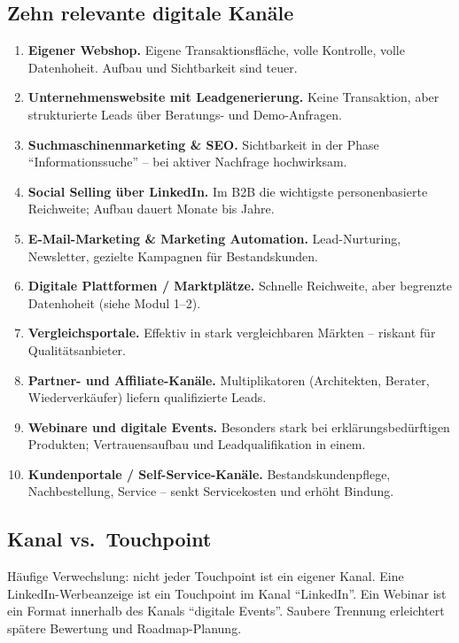 \documentclass[11pt,a4paper,oneside]{article}
\newcommand{\fachbegriff}[1]{\textbf{#1}}
\begin{document}
\subsection{Zehn relevante digitale Kanäle}

\begin{enumerate}
  \item \fachbegriff{Eigener Webshop.} Eigene Transaktionsfläche, volle Kontrolle, volle Datenhoheit. Aufbau und Sichtbarkeit sind teuer.
  \item \fachbegriff{Unternehmenswebsite mit Leadgenerierung.} Keine Transaktion, aber strukturierte Leads über Beratungs- und Demo-Anfragen.
  \item \fachbegriff{Suchmaschinenmarketing \& SEO.} Sichtbarkeit in der Phase ``Informationssuche'' -- bei aktiver Nachfrage hochwirksam.
  \item \fachbegriff{Social Selling über LinkedIn.} Im B2B die wichtigste personenbasierte Reichweite; Aufbau dauert Monate bis Jahre.
  \item \fachbegriff{E-Mail-Marketing \& Marketing Automation.} Lead-Nurturing, Newsletter, gezielte Kampagnen für Bestandskunden.
  \item \fachbegriff{Digitale Plattformen / Marktplätze.} Schnelle Reichweite, aber begrenzte Datenhoheit (siehe Modul 1--2).
  \item \fachbegriff{Vergleichsportale.} Effektiv in stark vergleichbaren Märkten -- riskant für Qualitätsanbieter.
  \item \fachbegriff{Partner- und Affiliate-Kanäle.} Multiplikatoren (Architekten, Berater, Wiederverkäufer) liefern qualifizierte Leads.
  \item \fachbegriff{Webinare und digitale Events.} Besonders stark bei erklärungsbedürftigen Produkten; Vertrauensaufbau und Leadqualifikation in einem.
  \item \fachbegriff{Kundenportale / Self-Service-Kanäle.} Bestandskundenpflege, Nachbestellung, Service -- senkt Servicekosten und erhöht Bindung.
\end{enumerate}

\subsection{Kanal vs.\ Touchpoint}

Häufige Verwechslung: nicht jeder Touchpoint ist ein eigener Kanal. Eine LinkedIn-Werbeanzeige ist ein Touchpoint im Kanal ``LinkedIn''. Ein Webinar ist ein Format innerhalb des Kanals ``digitale Events''. Saubere Trennung erleichtert spätere Bewertung und Roadmap-Planung.
\end{document}
